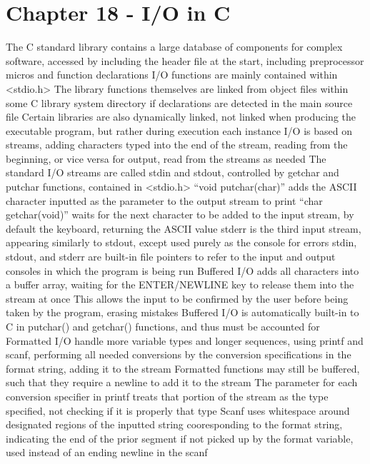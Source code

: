 \documentclass[11 pt, twoside]{article}
\newenvironment{outline*}
{
	\begin{outline}[enumerate]
	}
	{\end{outline}
}
\begin{document}
\section{Chapter 18 - I/O in C}
\begin{outline*}
\1 The C standard library contains a large database of components for complex software, accessed by including the header file at the start, including preprocessor micros and function declarations
\2 I/O functions are mainly contained within <stdio.h>
\2 The library functions themselves are linked from object files within some C library system directory if declarations are detected in the main source file
\3 Certain libraries are also dynamically linked, not linked when producing the executable program, but rather during execution each instance
\1 I/O is based on streams, adding characters typed into the end of the stream, reading from the beginning, or vice versa for output, read from the streams as needed
\2 The standard I/O streams are called stdin and stdout, controlled by getchar and putchar functions, contained in <stdio.h>
\3 ``void putchar(char)'' adds the ASCII character inputted as the parameter to the output stream to print
\3 ``char getchar(void)'' waits for the next character to be added to the input stream, by default the keyboard, returning the ASCII value
\3 stderr is the third input stream, appearing similarly to stdout, except used purely as the console for errors
\3 stdin, stdout, and stderr are built-in file pointers to refer to the input and output consoles in which the program is being run
\2 Buffered I/O adds all characters into a buffer array, waiting for the ENTER/NEWLINE key to release them into the stream at once
\3 This allows the input to be confirmed by the user before being taken by the program, erasing mistakes
\3 Buffered I/O is automatically built-in to C in putchar() and getchar() functions, and thus must be accounted for
\2 Formatted I/O handle more variable types and longer sequences, using printf and scanf, performing all needed conversions by the conversion specifications in the format string, adding it to the stream
\3 Formatted functions may still be buffered, such that they require a newline to add it to the stream
\3 The parameter for each conversion specifier in printf treats that portion of the stream as the type specified, not checking if it is properly that type
\3 Scanf uses whitespace around designated regions of the inputted string cooresponding to the format string, indicating the end of the prior segment if not picked up by the format variable, used instead of an ending newline in the scanf

\end{outline*}
\end{document}
